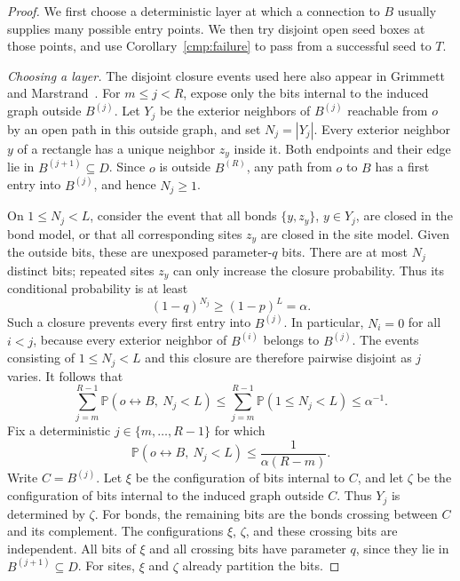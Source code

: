 \begin{proof}
We first choose a deterministic layer at which a connection to $B$
usually supplies many possible entry points. We then try disjoint open
seed boxes at those points, and use Corollary~\ref{cmp:failure} to pass
from a successful seed to $T$.

\emph{Choosing a layer.}
The disjoint closure events used here also appear in Grimmett and
Marstrand~\cite[Section~3, Lemma~3]{GrimmettMarstrand1990}.
For $m\le j<R$, expose only the bits internal to the induced graph
outside $B^{(j)}$. Let $Y_j$ be the exterior neighbors of $B^{(j)}$
reachable from $o$ by an open path in this outside graph, and set
$N_j=|Y_j|$.
Every exterior neighbor $y$ of a rectangle has a unique neighbor
$z_y$ inside it. Both endpoints and their edge lie in
$B^{(j+1)}\subseteq D$.
Since $o$ is outside $B^{(R)}$, any path from $o$ to $B$ has a first
entry into $B^{(j)}$, and hence $N_j\ge1$.

On $1\le N_j<L$, consider the event that all bonds $\{y,z_y\}$,
$y\in Y_j$, are closed in the bond model, or that all corresponding
sites $z_y$ are closed in the site model.
Given the outside bits, these are unexposed parameter-$q$ bits.
There are at most $N_j$ distinct bits; repeated sites $z_y$ can only
increase the closure probability. Thus its conditional probability
is at least
\[
 (1-q)^{N_j}\ge (1-p)^L=\alpha.
\]
Such a closure prevents every first entry into $B^{(j)}$.
In particular, $N_i=0$ for all $i<j$, because every exterior neighbor
of $B^{(i)}$ belongs to $B^{(j)}$.
The events consisting of $1\le N_j<L$ and this closure are therefore
pairwise disjoint as $j$ varies. It follows that
\[
 \sum_{j=m}^{R-1}\mathbb P(o\leftrightarrow B,\ N_j<L)
 \le \sum_{j=m}^{R-1}\mathbb P(1\le N_j<L)
 \le \alpha^{-1}.
\]
Fix a deterministic $j\in\{m,\ldots,R-1\}$ for which
\begin{equation}
 \mathbb P(o\leftrightarrow B,\ N_j<L)
 \le \frac{1}{\alpha(R-m)}.
 \label{ext:layer}
\end{equation}
Write $C=B^{(j)}$. Let $\xi$ be the configuration of bits internal
to $C$, and let $\zeta$ be the configuration of bits internal to the
induced graph outside $C$. Thus $Y_j$ is determined by $\zeta$.
For bonds, the remaining bits are the bonds crossing between $C$
and its complement. The configurations $\xi$, $\zeta$, and these
crossing bits are independent. All bits of $\xi$ and all crossing
bits have parameter $q$, since they lie in $B^{(j+1)}\subseteq D$.
For sites, $\xi$ and $\zeta$ already partition the bits.


\end{proof}
